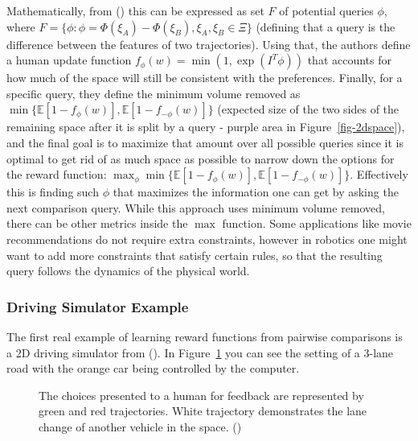 \documentclass[
  letterpaper,
  numbers=noenddot,
  DIV=11]{scrreprt}
\theoremstyle{definition}
\theoremstyle{plain}
\theoremstyle{plain}
\theoremstyle{remark}
\begin{document}
Mathematically, from () this can be expressed as set \(F\) of potential queries \(\phi\),
where
\(F = \{\phi: \phi = \Phi(\xi_A) - \Phi(\xi_B), \xi_A, \xi_B \in \Xi\}\)
(defining that a query is the difference between the features of two
trajectories). Using that, the authors define a human update function
\(f_{\phi}(w) = \min(1, \exp(I^T\phi))\) that accounts for how much of
the space will still be consistent with the preferences. Finally, for a
specific query, they define the minimum volume removed as
\(\min\{\mathbb{E}[1 - f_{\phi}(w)], \mathbb{E}[1 - f_{-\phi}(w)]\}\)
(expected size of the two sides of the remaining space after it is split
by a query - purple area in Figure~\ref{fig-2dspace}), and the final
goal is to maximize that amount over all possible queries since it is
optimal to get rid of as much space as possible to narrow down the
options for the reward function:
\(\max_{\phi} \min\{ \mathbb{E}[1 - f_{\phi}(w)], \mathbb{E}[1 - f_{-\phi}(w)]\}\).
Effectively this is finding such \(\phi\) that maximizes the information
one can get by asking the next comparison query. While this approach
uses minimum volume removed, there can be other metrics inside the
\(\max\) function. Some applications like movie recommendations do not
require extra constraints, however in robotics one might want to add
more constraints that satisfy certain rules, so that the resulting query
follows the dynamics of the physical world.

\subsubsection*{Driving Simulator
Example}\label{driving-simulator-example}

The first real example of learning reward functions from pairwise
comparisons is a 2D driving simulator from
(). In
Figure~\ref{fig-car_direct} you can see the setting of a 3-lane road
with the orange car being controlled by the computer.

\begin{figure}


\caption{\label{fig-car_direct}The choices presented to a human for
feedback are represented by green and red trajectories. White trajectory
demonstrates the lane change of another vehicle in the space.
()}

\end{figure}%
\end{document}
